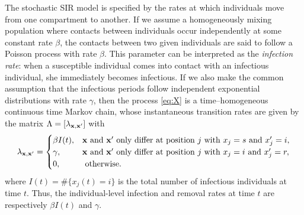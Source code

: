 \documentclass[11pt]{article}
\newcommand{\jx}[1]{{\color{blue}{ #1}}}
\begin{document}
	The stochastic SIR model is specified by the rates at which individuals move from one compartment to another. If we assume a homogeneously mixing population where contacts between individuals occur independently at some constant rate $\beta$, the contacts between two given individuals are said to follow a Poisson process with rate $\beta$. This parameter can be interpreted as the \textit{infection rate}: when a susceptible individual comes into contact with an infectious individual, she immediately becomes infectious.
	If we also make the common assumption that the infectious periods follow independent exponential distributions with rate $\gamma$, then the process \eqref{eq:X} is a time–homogeneous continuous time Markov chain, whose instantaneous transition rates
	are given by the matrix $\Lambda = [\lambda_{\mathbf{x}, \mathbf{x}'}]$ with
	$$
	\lambda_{\mathbf{x}, \mathbf{x}'} = 
	\begin{cases}
		\beta I(t), & \mathbf{x} \text{ and } \mathbf{x}' \text{ only differ at position } j \text{ with } x_j = s \text{ and } x_j' = i, \\
		\gamma, & \mathbf{x} \text{ and } \mathbf{x}' \text{ only differ at position } j \text{ with } x_j = i \text{ and } x_j' = r, \\
		0, & \text{ otherwise.}
	\end{cases}
	$$
	where $I(t) = \#\{x_j(t) = i\}$ is the total number of infectious individuals at time $t$. Thus, the individual-level infection and removal rates at time $t$ are respectively $\beta I(t)$ and $\gamma$.
	
	
\end{document}
